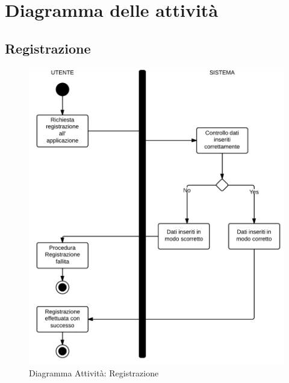 \chapter{Diagramma delle attività}

\section{Registrazione}
\begin{figure}[H]
\centering
\includegraphics[scale=0.22]{img/activity/Reg.png}
\caption{Diagramma Attività: Registrazione}
\label{fig:attreg}
\end{figure}

